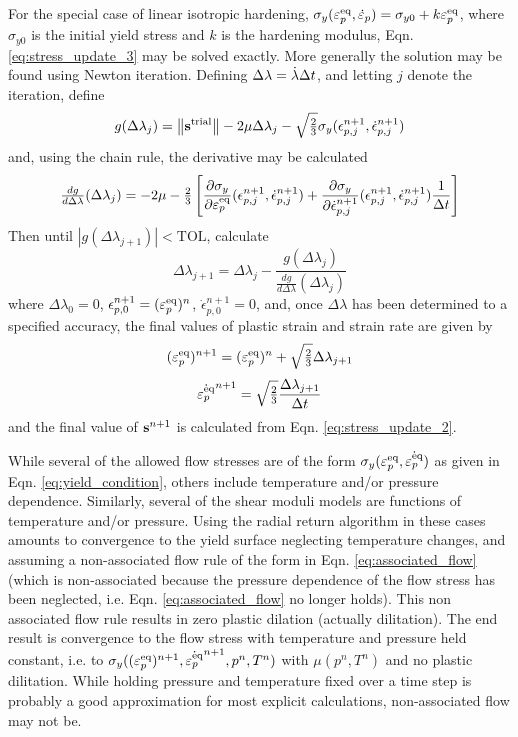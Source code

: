 For the special case of linear isotropic hardening,
$\sigma_y(\varepsilon_p^\text{eq},\dot{\varepsilon}_{p})=\sigma_{y0}+k\varepsilon_p^\text{eq}$, where $\sigma_{y0}$ is the
initial yield stress and $k$ is the hardening modulus,
Eqn. \ref{eq:stress_update_3} may be solved exactly.  More generally
the solution may be found using Newton iteration.  Defining
$\Delta\lambda = \dot{\lambda}\Delta t$, and letting $j$ denote the
iteration, define
  \begin{equation}
     g(\Delta\lambda_j) = \left\lVert\mathbf{s}^{\text{trial}}\right\rVert - 2\mu\Delta\lambda_j - \sqrt{\tfrac{2}{3}}\sigma_y(\epsilon_{p,j}^{n+1},\dot{\epsilon}_{p,j}^{n+1})
  \end{equation}
and, using the chain rule, the derivative may be calculated
  \begin{equation}
     {\tfrac{dg}{d\Delta\lambda}}(\Delta\lambda_j) = - 2\mu - {\tfrac{2}{3}}\left[\frac{\partial\sigma_y}{\partial\varepsilon_p^\text{eq}}(\epsilon_{p,j}^{n+1},\dot{\epsilon}_{p,j}^{n+1}) + \frac{\partial\sigma_y}{\partial{\dot{\epsilon}_{p,j}^{n+1}}}(\epsilon_{p,j}^{n+1},\dot{\epsilon}_{p,j}^{n+1})\frac{1}{\Delta t} \right]
  \end{equation}
Then until $|g(\Delta\lambda_{j+1})| < \text{TOL}$, calculate
  \begin{equation}
     \Delta\lambda_{j+1}=\Delta\lambda_j-\frac{g(\Delta\lambda_j)}{\frac{dg}{d\Delta\lambda}(\Delta\lambda_j)}
  \end{equation}
where $\Delta\lambda_0=0$, $\epsilon_{p,0}^{n+1}=(\varepsilon_p^\text{eq})^n$,
$\dot{\epsilon}_{p,0}^{n+1}=0$, and, once $\Delta\lambda$ has been
determined to a specified accuracy, the final values of plastic strain
and strain rate are given by
  \begin{equation}
    (\varepsilon_p^\text{eq})^{n+1}=(\varepsilon_p^\text{eq})^n+\sqrt{\tfrac{2}{3}}\Delta\lambda_{j+1}
  \end{equation}
  \begin{equation}
    \dot{\varepsilon_p^\text{eq}}^{n+1}=\sqrt{\tfrac{2}{3}}\frac{\Delta\lambda_{j+1}}{\Delta t}
  \end{equation}
and the final value of $\mathbf{s}^{n+1}$ is calculated from Eqn. \ref{eq:stress_update_2}.

While several of the allowed flow stresses are of the form
$\sigma_y(\varepsilon_p^\text{eq},\dot{\varepsilon_p^\text{eq}})$ as given in Eqn. \ref{eq:yield_condition},
others include temperature and/or pressure dependence.  Similarly,
several of the shear moduli models are functions of temperature and/or
pressure.  Using the radial return algorithm in these cases amounts to
convergence to the yield surface neglecting temperature changes, and
assuming a non-associated flow rule of the form in
Eqn. \ref{eq:associated_flow} (which is non-associated because the
pressure dependence of the flow stress has been neglected,
i.e. Eqn. \ref{eq:associated_flow} no longer holds).  This non
associated flow rule results in zero plastic dilation (actually
dilitation).  The end result is convergence to the flow stress with
temperature and pressure held constant, i.e. to
$\sigma_y((\varepsilon_p^\text{eq})^{n+1},\dot{\varepsilon_p^\text{eq}}^{n+1},p^n,T^n)$ with $\mu(p^n,T^n)$ and
no plastic dilitation.  While holding pressure and temperature fixed
over a time step is probably a good approximation for most explicit
calculations, non-associated flow may not be.

